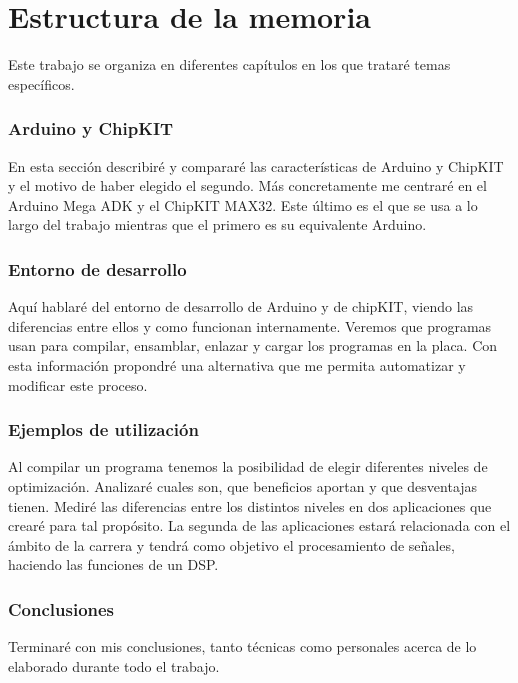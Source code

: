 \section{Estructura de la memoria}
Este trabajo se organiza en diferentes capítulos en los que trataré temas específicos.

\subsubsection{Arduino y ChipKIT}
En esta sección describiré y compararé las características de Arduino y ChipKIT y el motivo de haber elegido el segundo. Más concretamente me centraré en el Arduino Mega ADK y el ChipKIT MAX32. Este último es el que se usa a lo largo del trabajo mientras que el primero es su equivalente Arduino.

\subsubsection{Entorno de desarrollo}
Aquí hablaré del entorno de desarrollo de Arduino y de chipKIT, viendo las diferencias entre ellos y como funcionan internamente. Veremos que programas usan para compilar, ensamblar, enlazar y cargar los programas en la placa. Con esta información propondré una alternativa que me permita automatizar y modificar este proceso.

\subsubsection{Ejemplos de utilización}
Al compilar un programa tenemos la posibilidad de elegir diferentes niveles de optimización. Analizaré cuales son, que beneficios aportan y que desventajas tienen. Mediré las diferencias entre los distintos niveles en dos aplicaciones que crearé para tal propósito. La segunda de las aplicaciones estará relacionada con el ámbito de la carrera y tendrá como objetivo el procesamiento de señales, haciendo las funciones de un DSP.

\subsubsection{Conclusiones}
Terminaré con mis conclusiones, tanto técnicas como personales acerca de lo elaborado durante todo el trabajo.
